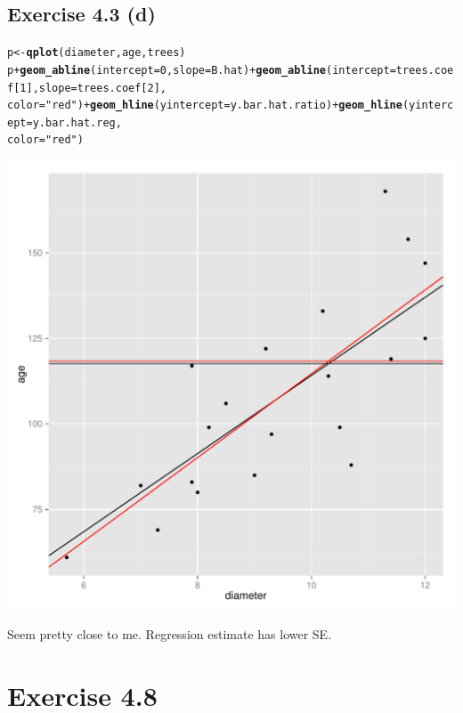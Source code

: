 \documentclass{article}\usepackage{graphicx, color}
\makeatletter
\newcommand{\hlfunctioncall}[1]{\textcolor[rgb]{0.501960784313725,0,0.329411764705882}{\textbf{#1}}}%
\newcommand{\hlstring}[1]{\textcolor[rgb]{0.6,0.6,1}{#1}}%
\newenvironment{kframe}{%
 \def\at@end@of@kframe{}%
 \ifinner\ifhmode%
  \def\at@end@of@kframe{\end{minipage}}%
  \begin{minipage}{\columnwidth}%
 \fi\fi%
 \def\FrameCommand##1{\hskip\@totalleftmargin \hskip-\fboxsep
 \colorbox{shadecolor}{##1}\hskip-\fboxsep
     \hskip-\linewidth \hskip-\@totalleftmargin \hskip\columnwidth}%
 \MakeFramed {\advance\hsize-\width
   \@totalleftmargin\z@ \linewidth\hsize
   \@setminipage}}%
 {\par\unskip\endMakeFramed%
 \at@end@of@kframe}
\newenvironment{knitrout}{}{} %
\makeatother
\begin{document}
\subsection*{Exercise 4.3 (d)}
\begin{knitrout}
\color{fgcolor}\begin{kframe}
\begin{alltt}
p <- \hlfunctioncall{qplot}(diameter, age, trees)
p + \hlfunctioncall{geom_abline}(intercept = 0, slope = B.hat) + \hlfunctioncall{geom_abline}(intercept = trees.coef[1], slope = trees.coef[2], 
    color = \hlstring{"red"}) + \hlfunctioncall{geom_hline}(yintercept = y.bar.hat.ratio) + \hlfunctioncall{geom_hline}(yintercept = y.bar.hat.reg, 
    color = \hlstring{"red"})
\end{alltt}
\end{kframe}

{\centering \includegraphics[width=.85\textwidth]{figure/unnamed-chunk-4} 

}


\end{knitrout}

Seem pretty close to me.  Regression estimate has lower SE.
\vfil
\newpage
\section*{Exercise 4.8}
\end{document}
